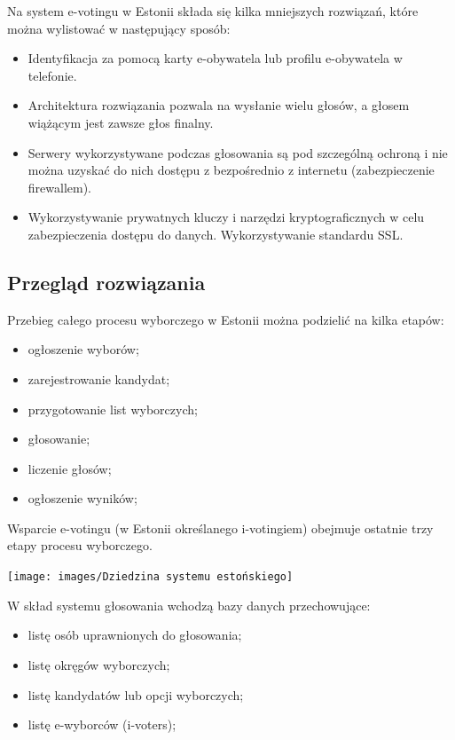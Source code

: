 \documentclass[a4paper,13pt]{report}
\begin{document}
Na system e-votingu  w Estonii składa się kilka mniejszych rozwiązań, które można wylistować w następujący sposób:
\begin{itemize}

    \item Identyfikacja za pomocą karty e-obywatela lub profilu e-obywatela w telefonie.

    \item Architektura rozwiązania pozwala na wysłanie wielu głosów, a głosem wiążącym jest zawsze głos finalny.

    \item Serwery wykorzystywane podczas głosowania są pod szczególną ochroną i nie można uzyskać do nich dostępu z bezpośrednio z internetu (zabezpieczenie firewallem).

    \item Wykorzystywanie prywatnych kluczy i narzędzi kryptograficznych w celu zabezpieczenia dostępu do danych. Wykorzystywanie standardu SSL.
    
\end{itemize}

\subsection{Przegląd rozwiązania}
Przebieg całego procesu wyborczego w Estonii można podzielić na kilka etapów:
\begin{itemize}
    \item ogłoszenie wyborów;
    \item zarejestrowanie kandydat;
    \item przygotowanie list wyborczych;
    \item głosowanie;
    \item liczenie głosów;
    \item ogłoszenie wyników;
\end{itemize}

Wsparcie e-votingu (w Estonii określanego i-votingiem) obejmuje ostatnie trzy etapy procesu wyborczego.

\texttt{[image: images/Dziedzina systemu estońskiego]}

W skład systemu głosowania wchodzą bazy danych przechowujące:
\begin{itemize}
    \item listę osób uprawnionych do głosowania;
    \item listę okręgów wyborczych;
    \item listę kandydatów lub opcji wyborczych;
    \item listę e-wyborców (i-voters);
\end{itemize}
\end{document}
